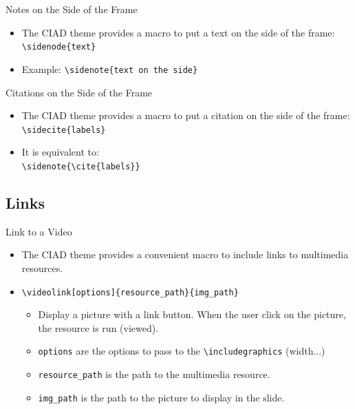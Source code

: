 \documentclass[english,sectioncirclenumberstyle]{ciadbeamer}
\begin{document}
\begin{frame}{Notes on the Side of the Frame}
	\begin{itemize}
	\item The CIAD theme provides a macro to put a text on the side of the frame: \\
		\texttt{{\textbackslash}sidenode\{text\}}
	\vspace{1em}
	\item Example: \texttt{{\textbackslash}sidenote\{text on the side\}}
	\end{itemize}
\end{frame}

\begin{frame}{Citations on the Side of the Frame}
	\begin{itemize}
	\item The CIAD theme provides a macro to put a citation on the side of the frame: \\
		\texttt{{\textbackslash}sidecite\{labels\}}
	\vspace{1em}
	\item It is equivalent to: \\
		\texttt{{\textbackslash}sidenote\{{\textbackslash}cite\{labels\}\}}
	\end{itemize}
\end{frame}

\subsection{Links}
\subsectiontableofcontentslide

\begin{frame}[t]{Link to a Video}
	\begin{itemize}
	\item The CIAD theme provides a convenient macro to include links to multimedia resources.
	\item \texttt{{\textbackslash}videolink[options]\{resource\_path\}\{img\_path\}}
		\begin{itemize}
		\item Display a picture with a link button. When the user click on the picture, the resource is run (viewed).
		\item \texttt{options} are the options to pass to the \texttt{{\textbackslash}includegraphics} (width...)
		\item \texttt{resource\_path} is the path to the multimedia resource.
		\item \texttt{img\_path} is the path to the picture to display in the slide.
		\end{itemize}
	\end{itemize}
	\begin{center}
	\end{center}
\end{frame}
\end{document}
